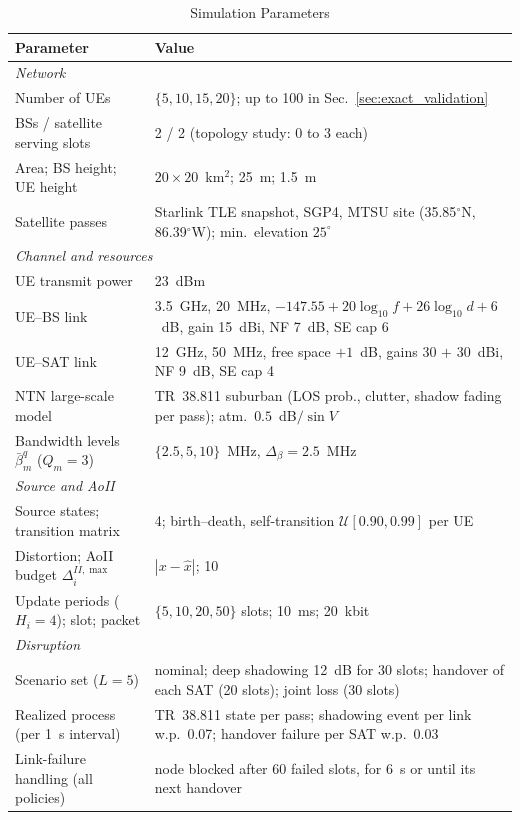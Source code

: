 \begin{table}[t]
\centering
\caption{Simulation Parameters}
\label{tab:simulation_parameters}
\scriptsize
\renewcommand{\arraystretch}{1.12}
\begin{tabular}{p{} p{}}
\hline
\textbf{Parameter} & \textbf{Value} \\
\hline
\multicolumn{2}{l}{\emph{Network}} \\
Number of UEs & $\{5,10,15,20\}$; up to 100 in Sec.~\ref{sec:exact_validation} \\
BSs / satellite serving slots & 2 / 2 (topology study: 0 to 3 each) \\
Area; BS height; UE height & $20\times20$~km$^2$; 25~m; 1.5~m \\
Satellite passes & Starlink TLE snapshot, SGP4, MTSU site (35.85$^\circ$N, 86.39$^\circ$W); min.\ elevation $25^\circ$ \\
\hline
\multicolumn{2}{l}{\emph{Channel and resources}} \\
UE transmit power & 23~dBm \\
UE--BS link & 3.5~GHz, 20~MHz, $-147.55+20\log_{10}f+26\log_{10}d+6$~dB, gain 15~dBi, NF 7~dB, SE cap 6 \\
UE--SAT link & 12~GHz, 50~MHz, free space $+1$~dB, gains 30 $+$ 30~dBi, NF 9~dB, SE cap 4 \\
NTN large-scale model & TR~38.811 suburban (LOS prob., clutter, shadow fading per pass); atm.\ $0.5$~dB$/\sin V$ \\
Bandwidth levels $\bar\beta^q_m$ ($Q_m=3$) & $\{2.5,5,10\}$~MHz, $\Delta_\beta=2.5$~MHz \\
\hline
\multicolumn{2}{l}{\emph{Source and AoII}} \\
Source states; transition matrix & 4; birth--death, self-transition $\mathcal{U}[0.90,0.99]$ per UE \\
Distortion; AoII budget $\Delta^{II,\max}_i$ & $|x-\hat x|$; 10 \\
Update periods ($H_i=4$); slot; packet & $\{5,10,20,50\}$ slots; 10~ms; 20~kbit \\
\hline
\multicolumn{2}{l}{\emph{Disruption}} \\
Scenario set ($L=5$) & nominal; deep shadowing 12~dB for 30 slots; handover of each SAT (20 slots); joint loss (30 slots) \\
Realized process (per 1~s interval) & TR~38.811 state per pass; shadowing event per link w.p.\ 0.07; handover failure per SAT w.p.\ 0.03 \\
Link-failure handling (all policies) & node blocked after 60 failed slots, for 6~s or until its next handover \\

\end{tabular}
\end{table}
